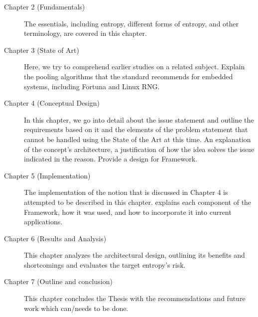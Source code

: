 \begin{description}
	\item[Chapter 2 (Fundamentals)] The essentials, including entropy, different forms of entropy, and other terminology, are covered in this chapter.
	\item[Chapter 3 (State of Art)] Here, we try to comprehend earlier studies on a related subject. Explain the pooling algorithms that the standard recommends for embedded systems, including Fortuna and Linux RNG.
	\item[Chapter 4 (Conceptual Design)] In this chapter, we go into detail about the issue statement and outline the requirements based on it and the elements of the problem statement that cannot be handled using the State of the Art at this time. An explanation of the concept's architecture, a justification of how the idea solves the issue indicated in the reason. Provide a design for Framework.
	\item[Chapter 5 (Implementation)] The implementation of the notion that is discussed in Chapter 4 is attempted to be described in this chapter. explains each component of the Framework, how it was used, and how to incorporate it into current applications.
	\item[Chapter 6 (Results and Analysis)] This chapter analyzes the architectural design, outlining its benefits and shortcomings and evaluates the target entropy's risk.
	\item[Chapter 7 (Outline and conclusion)] This chapter concludes the Thesis with the recommendations and future work which can/needs to be done.
\end{description}


